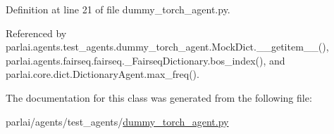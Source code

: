 Definition at line 21 of file dummy\+\_\+torch\+\_\+agent.\+py.



Referenced by parlai.\+agents.\+test\+\_\+agents.\+dummy\+\_\+torch\+\_\+agent.\+Mock\+Dict.\+\_\+\+\_\+getitem\+\_\+\+\_\+(), parlai.\+agents.\+fairseq.\+fairseq.\+\_\+\+Fairseq\+Dictionary.\+bos\+\_\+index(), and parlai.\+core.\+dict.\+Dictionary\+Agent.\+max\+\_\+freq().



The documentation for this class was generated from the following file\+:\begin{DoxyCompactItemize}
\item 
parlai/agents/test\+\_\+agents/\hyperlink{dummy__torch__agent_8py}{dummy\+\_\+torch\+\_\+agent.\+py}\end{DoxyCompactItemize}

